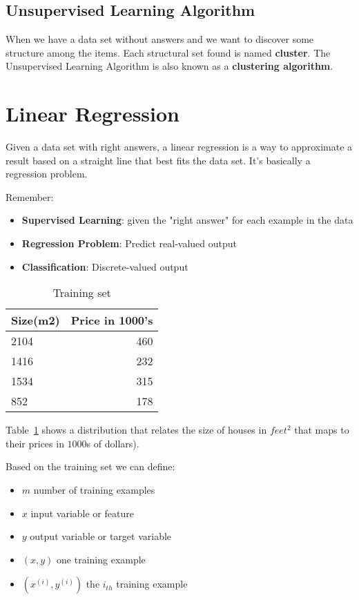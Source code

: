 \documentclass[a4paper]{article}
\begin{document}
\subsection{Unsupervised Learning Algorithm}

When we have a data set without answers and we want to discover some structure among the items. Each structural set found is named \textbf{cluster}. The Unsupervised Learning Algorithm is also known as a \textbf{clustering algorithm}.

\section{Linear Regression}

Given a data set with right answers, a linear regression is a way to approximate a result based on a straight line that best fits the data set. It's basically a regression problem.

\medskip

Remember:

\begin{itemize}
\item \textbf{Supervised Learning}: given the "right answer" for each example in the data
\item \textbf{Regression Problem}: Predict real-valued output
\item \textbf{Classification}: Discrete-valued output
\end{itemize}

\begin{table}[]
\centering
\begin{tabular}{l|r}
\textbf{Size(m2)} & \textbf{Price in 1000's} \\\hline
2104     & 460 \\
1416     & 232 \\
1534     & 315 \\
852      & 178
\end{tabular}
\caption{Training set}
\label{tab:training-set-example}
\end{table}

Table~\ref{tab:training-set-example} shows a distribution that relates the size of houses in $feet^2$ that maps to their prices in $1000$s of dollars).

Based on the training set we can define:

\begin{itemize}
\item $m$\: number of training examples
\item $x$\: input variable or feature
\item $y$\: output variable or target variable
\item $(x,y)$\: one training example
\item $(x^{(i)}, y^{(i)})$\: the $i_{th}$ training example
\end{itemize}
\end{document}
